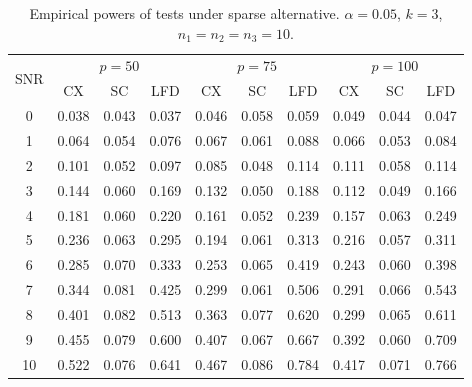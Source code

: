 \documentclass[12pt]{article} %
\theoremstyle{definition}
\begin{document}
\begin{table}[!hbp]
    \caption{Empirical powers of tests under sparse alternative. $\alpha=0.05$, $k=3$, $n_1=n_2=n_3=10$. }
    \label{table3}
\centering
\begin{tabular}{*{10}{c}}
\toprule
\multirow{2}{*}{SNR} &\multicolumn{3}{c}{$p=50$}&\multicolumn{3}{c}{$p=75$}&\multicolumn{3}{c}{$p=100$} \\
    \cmidrule(r){2-4}\cmidrule(r){5-7}\cmidrule(r){8-10}
        & CX & SC & LFD & CX &SC &LFD &CX & SC & LFD\\
\midrule
0 & 0.038 & 0.043 & 0.037 & 0.046 & 0.058 & 0.059 & 0.049 & 0.044 & 0.047 \\ 
1 & 0.064 & 0.054 & 0.076 & 0.067 & 0.061 & 0.088 & 0.066 & 0.053 & 0.084 \\ 
2 & 0.101 & 0.052 & 0.097 & 0.085 & 0.048 & 0.114 & 0.111 & 0.058 & 0.114 \\ 
3 & 0.144 & 0.060 & 0.169 & 0.132 & 0.050 & 0.188 & 0.112 & 0.049 & 0.166 \\ 
4 & 0.181 & 0.060 & 0.220 & 0.161 & 0.052 & 0.239 & 0.157 & 0.063 & 0.249 \\ 
5 & 0.236 & 0.063 & 0.295 & 0.194 & 0.061 & 0.313 & 0.216 & 0.057 & 0.311 \\ 
6 & 0.285 & 0.070 & 0.333 & 0.253 & 0.065 & 0.419 & 0.243 & 0.060 & 0.398 \\ 
7 & 0.344 & 0.081 & 0.425 & 0.299 & 0.061 & 0.506 & 0.291 & 0.066 & 0.543 \\ 
8 & 0.401 & 0.082 & 0.513 & 0.363 & 0.077 & 0.620 & 0.299 & 0.065 & 0.611 \\ 
9 & 0.455 & 0.079 & 0.600 & 0.407 & 0.067 & 0.667 & 0.392 & 0.060 & 0.709 \\ 
10 & 0.522 & 0.076 & 0.641 & 0.467 & 0.086 & 0.784 & 0.417 & 0.071 & 0.766 \\ 
\bottomrule
\end{tabular}
\end{table}
\end{document}
